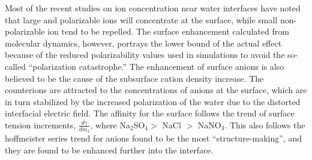 
Most of the recent studies on ion concentration near water interfaces have noted that large and polarizable ions will concentrate at the surface,\cite{Petersen2005b,Pegram2006,Sloutskin2007,Eggimann2008} while small non-polarizable ion tend to be repelled. The surface enhancement calculated from molecular dynamics, however, portrays the lower bound of the actual effect because of the reduced polarizability values used in simulations to avoid the so-called ``polarization catastrophe.'' The enhancement of surface anions is also believed to be the cause of the subsurface cation density increase. The counterions are attracted to the concentrations of anions at the surface, which are in turn stabilized by the increased polarization of the water due to the distorted interfacial electric field. The affinity for the surface follows the trend of surface tension increments, $\frac{d\gamma}{dm_2}$, where Na$_2$SO$_4 >$ NaCl $>$ NaNO$_3$.\cite{Pegram2006} This also follows the hoffmeister series trend for anions found to be the most ``structure-making'', and they are found to be enhanced further into the interface.
